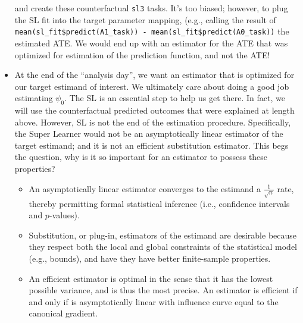 \documentclass[12pt, krantz2,]{book}
\theoremstyle{definition}
\theoremstyle{definition}
\theoremstyle{definition}
\newcommand{\1}{\mathbbm{1}}
\begin{document}
\begin{itemize}
  and create these counterfactual \texttt{sl3} tasks. It's too biased; however, to
  plug the SL fit into the target parameter mapping, (e.g., calling the result
  of \texttt{mean(sl\_fit\$predict(A1\_task))\ -\ mean(sl\_fit\$predict(A0\_task))} the
  estimated ATE. We would end up with an estimator for the ATE that was
  optimized for estimation of the prediction function, and not the ATE!
\item
  At the end of the ``analysis day'', we want an estimator that is optimized for
  our target estimand of interest. We ultimately care about doing a good job
  estimating \(\psi_0\). The SL is an essential step to help us get there. In
  fact, we will use the counterfactual predicted outcomes that were explained
  at length above. However, SL is not the end of the estimation procedure.
  Specifically, the Super Learner would not be an asymptotically linear
  estimator of the target estimand; and it is not an efficient substitution
  estimator. This begs the question, why is it so important for an estimator to
  possess these properties?

  \begin{itemize}
  \item
    An asymptotically linear estimator converges to the estimand a
    \(\frac{1}{\sqrt{n}}\) rate, thereby permitting formal statistical inference
    (i.e., confidence intervals and \(p\)-values).
  \item
    Substitution, or plug-in, estimators of the estimand are desirable because
    they respect both the local and global constraints of the statistical model
    (e.g., bounds), and have they have better finite-sample properties.
  \item
    An efficient estimator is optimal in the sense that it has the lowest
    possible variance, and is thus the most precise. An estimator is efficient
    if and only if is asymptotically linear with influence curve equal to the
    canonical gradient.


\end{itemize}
\end{itemize}
\end{document}
